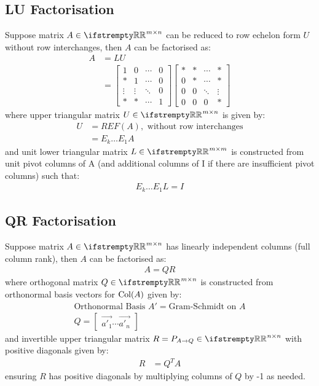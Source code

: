 \documentclass[12pt, a4paper]{article}
\begin{document}
\begin{multicols*}{3}
\subsection{LU Factorisation}
Suppose matrix $A \in \RR^{m{\times}n}$ can be reduced to row echelon form $U$ without row interchanges, then $A$ can be factorised as:
\begin{align*}
  A &= LU \\
    &= \begin{bmatrix}1 & 0 & \cdots & 0 \\ * & 1 & \cdots & 0 \\ \vdots & \vdots & \ddots & 0 \\ * & * & \cdots & 1\end{bmatrix}
       \begin{bmatrix}* & * & \cdots & * \\ 0 & * & \cdots & * \\ 0 & 0 & \ddots & \vdots \\ 0 & 0 & 0 & *\end{bmatrix}
\end{align*}
where upper triangular matrix $U \in \RR^{m{\times}n}$ is given by:
\begin{align*}
  U &= REF(A), \text{ without row interchanges} \\
    &= E_k{\ldots}E_1A
\end{align*}
and unit lower triangular matrix $L \in \RR^{m{\times}m}$ is constructed from unit pivot columns of A (and additional columns of I if there are insufficient pivot columns) such that:
\begin{align*}
  E_k{\ldots}E_1L = I
\end{align*}

\subsection{QR Factorisation}
Suppose matrix $A \in \RR^{m{\times}n}$ has linearly independent columns (full column rank), then $A$ can be factorised as:
\begin{align*}
  A = QR
\end{align*}
where orthogonal matrix $Q \in \RR^{m{\times}n}$ is constructed from orthonormal basis vectors for $\operatorname{Col}(A)$ given by:
\begin{gather*}
  \text{Orthonormal Basis }A' = \text{Gram-Schmidt on } A \\
  Q = \begin{bmatrix}\vec{a'_1} \cdots \vec{a'_n}\end{bmatrix}
\end{gather*}
and invertible upper triangular matrix $R = P_{A\rightarrow Q} \in \RR^{n{\times}n}$ with positive diagonals given by:
\begin{align*}
  R &= Q^TA
\end{align*}
ensuring $R$ has positive diagonals by multiplying columns of $Q$ by -1 as needed.


\end{multicols*}
\end{document}

